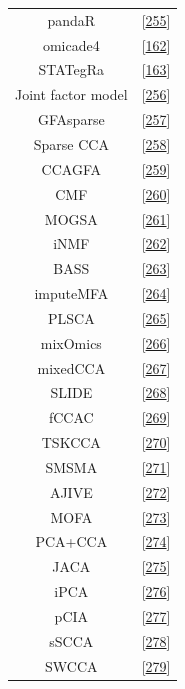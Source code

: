 \documentclass[
  a4paper,
]{book}
\begin{document}
\begin{longtable}[]{@{}cc@{}}
pandaR & {[}\protect\hyperlink{ref-schlauch2017}{255}{]} \\
omicade4 & {[}\protect\hyperlink{ref-meng2014}{162}{]} \\
STATegRa & {[}\protect\hyperlink{ref-planell2021}{163}{]} \\
Joint factor model & {[}\protect\hyperlink{ref-ray2014}{256}{]} \\
GFAsparse & {[}\protect\hyperlink{ref-bunte2016}{257}{]} \\
Sparse CCA & {[}\protect\hyperlink{ref-chen2013}{258}{]} \\
CCAGFA & {[}\protect\hyperlink{ref-leppuxe4aho2017}{259}{]} \\
CMF & {[}\protect\hyperlink{ref-klami2014}{260}{]} \\
MOGSA & {[}\protect\hyperlink{ref-meng2018}{261}{]} \\
iNMF & {[}\protect\hyperlink{ref-yang2016b}{262}{]} \\
BASS & {[}\protect\hyperlink{ref-zhao2015}{263}{]} \\
imputeMFA & {[}\protect\hyperlink{ref-voillet2016}{264}{]} \\
PLSCA & {[}\protect\hyperlink{ref-beaton2016}{265}{]} \\
mixOmics & {[}\protect\hyperlink{ref-singh2019}{266}{]} \\
mixedCCA & {[}\protect\hyperlink{ref-yoon2019}{267}{]} \\
SLIDE & {[}\protect\hyperlink{ref-gaynanova2017}{268}{]} \\
fCCAC & {[}\protect\hyperlink{ref-madrigal2017}{269}{]} \\
TSKCCA & {[}\protect\hyperlink{ref-yoshida2017}{270}{]} \\
SMSMA & {[}\protect\hyperlink{ref-kawaguchi2017}{271}{]} \\
AJIVE & {[}\protect\hyperlink{ref-feng2018}{272}{]} \\
MOFA & {[}\protect\hyperlink{ref-argelaguet2020}{273}{]} \\
PCA+CCA & {[}\protect\hyperlink{ref-brown2018}{274}{]} \\
JACA & {[}\protect\hyperlink{ref-zhang2020}{275}{]} \\
iPCA & {[}\protect\hyperlink{ref-tang2021}{276}{]} \\
pCIA & {[}\protect\hyperlink{ref-min2019}{277}{]} \\
sSCCA & {[}\protect\hyperlink{ref-safo2018}{278}{]} \\
SWCCA & {[}\protect\hyperlink{ref-min2017}{279}{]} \\

\end{longtable}
\end{document}
